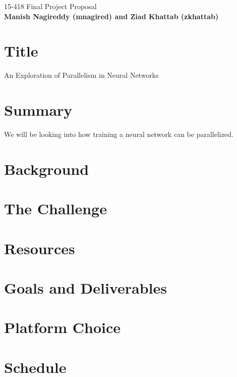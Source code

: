 \documentclass{article}
\begin{document}
\begin{center}

\Large{15-418 Final Project Proposal} \\
\vspace{1em}
\normalsize\textbf{Manish Nagireddy (mnagired) and Ziad Khattab (zkhattab)} \\
\vspace{1em}

\end{center}

\section*{Title}

An Exploration of Parallelism in Neural Networks

\section*{Summary}

We will be looking into how training a neural network can be parallelized.

\section*{Background}

\section*{The Challenge}

\section*{Resources}

\section*{Goals and Deliverables}

\section*{Platform Choice}

\section*{Schedule}
\end{document}

